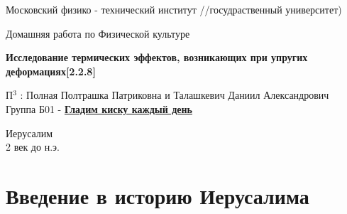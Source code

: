 \documentclass[a4paper,12pt]{article}
\begin{document}
\begin{titlepage}

\newpage
\begin{center}
\normalsize Московский физико - технический институт //госудраственный университет)
\end{center}

\vspace{6em}

\begin{center}
\Large Домашняя работа по Физической культуре\\
\end{center}

\vspace{1em}

\begin{center}
\large \textbf{ Исследование термических эффектов,
возникающих при упругих деформациях[2.2.8] }
\end{center}

\vspace{2em}

\begin{center}
\large П$ ^ 3$ : Полная Полтрашка Патриковна и Талашкевич Даниил Александрович \\
Группа Б01 - \href{ https://vk.com/rt_kiska }{\textbf{Гладим киску каждый день}}
\end{center}

\vspace{\fill}

\begin{center}
    \large Иерусалим \\ 2 век до н.э.
\end{center}

\end{titlepage}



    \thispagestyle{empty}
    \newpage
    \tableofcontents
    \newpage
    \setcounter{page}{1}


\section{Введение в историю Иерусалима}
\end{document}
